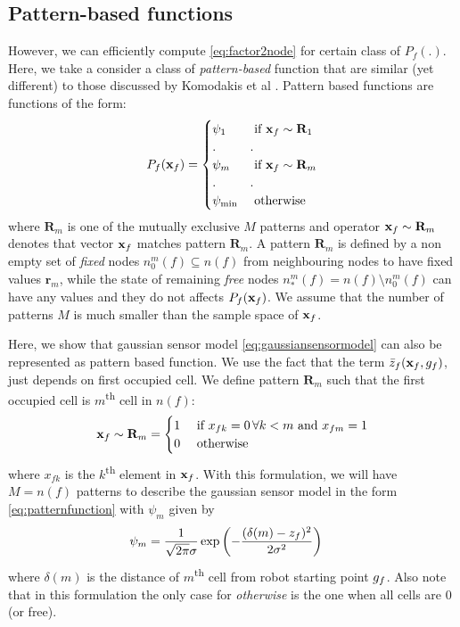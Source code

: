 \documentclass[letterpaper, 10 pt, conference]{ieeeconf} %
\newcommand{\vect}[1]{\mathbf{#1}}
\begin{document}
\subsection{Pattern-based functions}
\label{sec:patternfunctions}
However, we can efficiently compute \eqref{eq:factor2node} for certain class of
$P_f(.)$. Here, we take a consider a class of \emph{pattern-based} function
that are similar (yet different) to those discussed by Komodakis et al
\cite{komodakis2009beyond}. Pattern based functions are functions of the form:
\begin{align}
  P_f(\map_f) = \begin{cases}
    \psi_{1} & \text{ if $\map_f \sim \vect{R}_1$}\\
            .&.\\
    \psi_{m} & \text{ if $\map_f \sim \vect{R}_m$}\\
            .&.\\
    \psi_{\text{min}} & \text{ otherwise}
  \end{cases}
  \label{eq:patternfunction}
\end{align}
where $\vect{R}_m$ is one of the mutually exclusive $M$ patterns and operator
$\map_f \sim \vect{R}_m$ denotes that vector $\map_f$ matches pattern
$\vect{R}_m$.  
A pattern $\vect{R}_m$ is defined by a non empty set of \emph{fixed} nodes
$n^m_0(f) \subseteq n(f)$ from neighbouring nodes to have fixed values $\vect{r}_m$, 
while the state of remaining \emph{free} nodes $n^m_*(f) = n(f) \setminus
n^m_0(f)$ can have any values and they do not affects $P_f(\map_f)$.
We assume that the number
of patterns $M$ is much smaller than the sample space of $\map_f$.

Here, we show that gaussian sensor
model \eqref{eq:gaussiansensormodel} can also be represented as pattern based function. 
We use the fact that the term $\bar{\meas}_f(\map_f, \pose_f)$, just depends on
first occupied cell. We define pattern $\vect{R}_m$ such that the first
occupied cell is $m$\textsuperscript{th} cell in $n(f)$:
\begin{align}
  \map_f \sim \vect{R}_m = \begin{cases}
    1 & \text{ if $x_{fk} = 0 \, \forall k < m$ and $x_{fm} = 1$}\\
    0 & \text{ otherwise}
  \end{cases}
\end{align}
where $x_{fk}$ is the $k$\textsuperscript{th} element in $\map_f$. With
this formulation, we will have $M = n(f)$ patterns to describe the gaussian
sensor model in the form \eqref{eq:patternfunction} with $\psi_m$ given by
\begin{align}
  \psi_m &= \frac{1}{\sqrt{2\pi}\sigma}\exp\left(-\frac{(\delta(m)- z_f)^2}{2\sigma^2}\right)
\end{align}
where $\delta(m)$ is the distance of $m$\textsuperscript{th} cell from robot
starting point $g_f$. Also note that in this formulation the only case for
\emph{otherwise} is the one when all cells are $0$ (or free).
\end{document}
